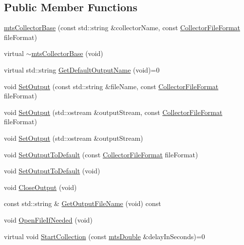 \subsection*{Public Member Functions}
\begin{DoxyCompactItemize}
\item 
\hyperlink{classmts_collector_base_a60f7407181c031a8e8c57fdd48c4e6c7}{mts\-Collector\-Base} (const std\-::string \&collector\-Name, const \hyperlink{classmts_collector_base_aa228bed8144053d0bfa316f9ac9d0901}{Collector\-File\-Format} file\-Format)
\item 
virtual \hyperlink{classmts_collector_base_a25a5386c1465c3bc95379d427729d0b5}{$\sim$mts\-Collector\-Base} (void)
\item 
virtual std\-::string \hyperlink{classmts_collector_base_a60da1298e1272b6af21a2eb94d4844f0}{Get\-Default\-Output\-Name} (void)=0
\item 
void \hyperlink{classmts_collector_base_a821b7d5be652daf529c461c7d3ba3f4e}{Set\-Output} (const std\-::string \&file\-Name, const \hyperlink{classmts_collector_base_aa228bed8144053d0bfa316f9ac9d0901}{Collector\-File\-Format} file\-Format)
\item 
void \hyperlink{classmts_collector_base_aa3066c51680e52859f05db71a97bf9c1}{Set\-Output} (std\-::ostream \&output\-Stream, const \hyperlink{classmts_collector_base_aa228bed8144053d0bfa316f9ac9d0901}{Collector\-File\-Format} file\-Format)
\item 
void \hyperlink{classmts_collector_base_ada2f3c5a80035350ae0d4c0a1f79d10f}{Set\-Output} (std\-::ostream \&output\-Stream)
\item 
void \hyperlink{classmts_collector_base_a3467807159d338a761a2e7b730a582ce}{Set\-Output\-To\-Default} (const \hyperlink{classmts_collector_base_aa228bed8144053d0bfa316f9ac9d0901}{Collector\-File\-Format} file\-Format)
\item 
void \hyperlink{classmts_collector_base_a6c951b134d74648c86d5b54d04238c50}{Set\-Output\-To\-Default} (void)
\item 
void \hyperlink{classmts_collector_base_aa9ba1bf118223c5cb9d5700a4cf6efaa}{Close\-Output} (void)
\item 
const std\-::string \& \hyperlink{classmts_collector_base_ad28d8ad97ed6592efb1d4a388523773d}{Get\-Output\-File\-Name} (void) const 
\item 
void \hyperlink{classmts_collector_base_a796db0258af6b2297ab530aaf509ba8f}{Open\-File\-If\-Needed} (void)
\item 
virtual void \hyperlink{classmts_collector_base_a2fde70b19fbe88b049e8a8d19320f2c2}{Start\-Collection} (const \hyperlink{mts_generic_object_proxy_8h_a31e76b0190a8d3f9838626cd7b47bd75}{mts\-Double} \&delay\-In\-Seconds)=0

\end{DoxyCompactItemize}
